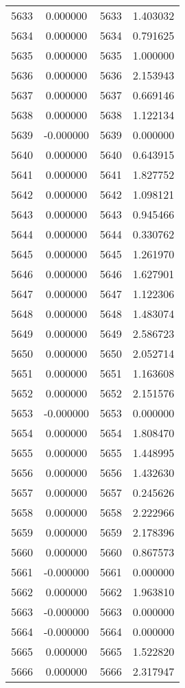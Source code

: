 \documentclass[12pt]{article}
\begin{document}
\begin{longtable}{@{}cccc@{}}
5633 & 0.000000 & 5633 & 1.403032 \\
5634 & 0.000000 & 5634 & 0.791625 \\
5635 & 0.000000 & 5635 & 1.000000 \\
5636 & 0.000000 & 5636 & 2.153943 \\
5637 & 0.000000 & 5637 & 0.669146 \\
5638 & 0.000000 & 5638 & 1.122134 \\
5639 & -0.000000 & 5639 & 0.000000 \\
5640 & 0.000000 & 5640 & 0.643915 \\
5641 & 0.000000 & 5641 & 1.827752 \\
5642 & 0.000000 & 5642 & 1.098121 \\
5643 & 0.000000 & 5643 & 0.945466 \\
5644 & 0.000000 & 5644 & 0.330762 \\
5645 & 0.000000 & 5645 & 1.261970 \\
5646 & 0.000000 & 5646 & 1.627901 \\
5647 & 0.000000 & 5647 & 1.122306 \\
5648 & 0.000000 & 5648 & 1.483074 \\
5649 & 0.000000 & 5649 & 2.586723 \\
5650 & 0.000000 & 5650 & 2.052714 \\
5651 & 0.000000 & 5651 & 1.163608 \\
5652 & 0.000000 & 5652 & 2.151576 \\
5653 & -0.000000 & 5653 & 0.000000 \\
5654 & 0.000000 & 5654 & 1.808470 \\
5655 & 0.000000 & 5655 & 1.448995 \\
5656 & 0.000000 & 5656 & 1.432630 \\
5657 & 0.000000 & 5657 & 0.245626 \\
5658 & 0.000000 & 5658 & 2.222966 \\
5659 & 0.000000 & 5659 & 2.178396 \\
5660 & 0.000000 & 5660 & 0.867573 \\
5661 & -0.000000 & 5661 & 0.000000 \\
5662 & 0.000000 & 5662 & 1.963810 \\
5663 & -0.000000 & 5663 & 0.000000 \\
5664 & -0.000000 & 5664 & 0.000000 \\
5665 & 0.000000 & 5665 & 1.522820 \\
5666 & 0.000000 & 5666 & 2.317947 \\

\end{longtable}
\end{document}
